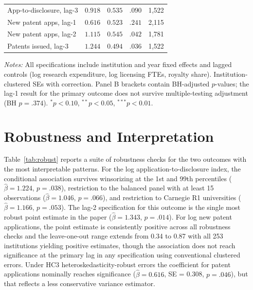 \documentclass[12pt]{article}
\begin{document}
\begin{table}[htbp]
\begin{threeparttable}
\begin{tabular}{lrrrr}
App-to-disclosure, lag-3 & $0.918$ & $0.535$ & $.090$ & 1,522 \\
New patent apps, lag-1 & $0.616$ & $0.523$ & $.241$ & 2,115 \\
New patent apps, lag-2 & $1.115$ & $0.545$ & $.042$ & 1,781 \\
Patents issued, lag-3 & $1.244$ & $0.494$ & $.036$ & 1,522 \\
\bottomrule
\end{tabular}
\begin{tablenotes}
\small
\item \textit{Notes:} All specifications include institution and year fixed effects and
lagged controls (log research expenditure, log licensing FTEs, royalty share). Institution-clustered
SEs with \citet{cameron2015} correction. Panel B brackets contain BH-adjusted $p$-values;
the lag-1 result for the primary outcome does not survive multiple-testing adjustment
(BH $p = .374$). $^*p<0.10$, $^{**}p<0.05$, $^{***}p<0.01$.
\end{tablenotes}
\end{threeparttable}
\end{table}

\section{Robustness and Interpretation}
\label{sec:robust}

Table~\ref{tab:robust} reports a suite of robustness checks for the two outcomes with
the most interpretable patterns. For the log application-to-disclosure index, the
conditional association survives winsorizing at the 1st and 99th percentiles
($\hat\beta = 1.224$, $p = .038$), restriction to the balanced panel with at least 15
observations ($\hat\beta = 1.046$, $p = .066$), and restriction to Carnegie R1
universities ($\hat\beta = 1.166$, $p = .053$). The lag-2 specification for this
outcome is the single most robust point estimate in the paper ($\hat\beta = 1.343$,
$p = .014$). For log new patent applications, the point estimate is consistently
positive across all robustness checks and the leave-one-out range extends from 0.34
to 0.87 with all 253 institutions yielding positive estimates, though the association
does not reach significance at the primary lag in any specification using conventional
clustered errors. Under HC3 heteroskedasticity-robust errors the coefficient for patent
applications nominally reaches significance ($\hat\beta = 0.616$, SE = 0.308, $p = .046$),
but that reflects a less conservative variance estimator.
\end{document}
